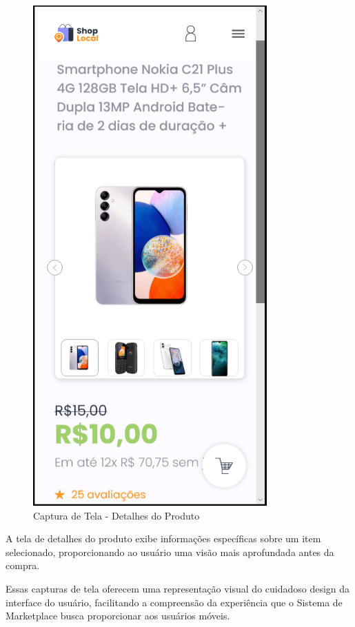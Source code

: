 \documentclass[
	12pt,				%
	openright,			%
	twoside,			%
	a4paper,			%
	english,			%
	brazil				%
	]{abntex2}
\begin{document}
\begin{figure}[htb]
    \centering
    \includegraphics[width=0.8\textwidth]{img/product}
    \caption{Captura de Tela - Detalhes do Produto}
\end{figure}

A tela de detalhes do produto exibe informações específicas sobre um item selecionado, proporcionando ao usuário uma visão mais aprofundada antes da compra.

Essas capturas de tela oferecem uma representação visual do cuidadoso design da interface do usuário, facilitando a compreensão da experiência que o Sistema de Marketplace busca proporcionar aos usuários móveis.
\end{document}
